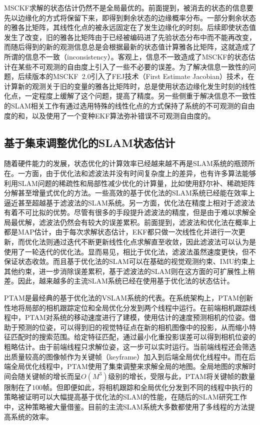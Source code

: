 MSCKF求解的状态估计仍然不是全局最优的。前面提到，被消去的状态的信息要先以边缘化的方式将保留下来，即得到剩余状态的边缘概率分布。一部分剩余状态的雅各比矩阵，其线性化点的被永远固定在了发生边缘化的时刻。后续即使状态值发生了改变，旧的雅各比矩阵由于已经被编码进了先验状态分布中而不能再改变，而随后得到的新的观测信息总是会根据最新的状态值计算雅各比矩阵，这就造成了所谓的信息不一致（inconsistency）。客观上，信息不一致造成了MSCKF的状态估计在某些不可观测的自由度上引入了一些不必要的误差。为了解决信息一致性的问题，后续版本的MSCKF~2.0\citep{li2012improving}引入了FEJ技术（First Estimate Jacobian）技术\citep{huang2008analysis}，在计算新的观测关于旧的变量的雅各比矩阵时，总是使用状态边缘化发生时刻的线性化点，一定程度上缓解了这个问题，提高了精度。另一些侧重于解决信息不一致性的SLAM相关工作有通过选用特殊的线性化点的方式保持了系统的不可观测的自由度的和，以及使用了一个变种EKF算法弥补错误不可观测自由度的。

\subsection{基于集束调整优化的SLAM状态估计}

随着硬件能力的发展，状态优化的计算效率已经越来越不再是SLAM系统的瓶颈所在。一方面，由于优化法和滤波法并没有时间复杂度上的差异，也有许多算法能够利用SLAM问题的稀疏性和局部性减少优化的计算量，比如使用舒尔补、稀疏矩阵分解甚至增量式优化的方法。一些高效的基于优化法的SLAM系统已经能在效率上逼近甚至超越基于滤波法的SLAM系统。另一方面，优化法在精度上相对于滤波法有着不可比拟的优势。尽管有很多的手段提升滤波法的精度，但是由于难以求解全局最优解，滤波法仍然会有较大的误差累积。前面提到，滤波法和优化法在概率上都是MAP估计，由于每次求解状态估计，EKF都只做一次线性化并进行一次更新，而优化法则通过迭代不断更新线性化点求解直至收敛，因此滤波法可以认为是使用了一轮迭代的优化法。显而易见，相比于优化法，滤波法虽然速度更快，但不保证状态收敛。而且基于优化法的SLAM可以在基础的视觉观测约束、IMU约束上其他约束，进一步消除误差累积，基于滤波法的SLAM则在这方面的可扩展性上稍差。因此，越来越多的主流SLAM系统已经在使用基于优化法的状态估计。

PTAM\citep{klein2007parallel}是最经典的基于优化法的VSLAM系统的代表。在系统架构上，PTAM创新性地将局部的相机跟踪定位和全局优化分发到两个线程中运行。在前端相机跟踪线程中，PTAM对系统的移动速度进行了建模，使用估计的速度预测相机的位姿。借助于预测的位姿，可以得到旧的视觉特征点在新的相机图像中的投影，从而缩小特征匹配时的搜索范围。给定特征匹配，通过最小化重投影误差可以得到相机位姿的粗略估计。由于前端线程只求解位姿，这一步可以实时运行。当前端线程还会筛选出质量较高的图像帧作为关键帧（keyframe）加入到后端全局优化线程中。而在后端全局优化线程中，PTAM使用了集束调整来求解全局的地图。全局地图的求解时间会随关键帧的增长而呈$O(M^3)$级别的增长，受限与此，PTAM将关键帧的数量限制在了$100$帧。但即便如此，将相机跟踪和全局优化分发到不同的线程中执行的策略被证明可以大幅提高基于优化法的SLAM的性能，在随后的SLAM研究工作中，这种策略被大量借鉴。目前的主流SLAM系统大多数都使用了多线程的方法提高系统的效率。

